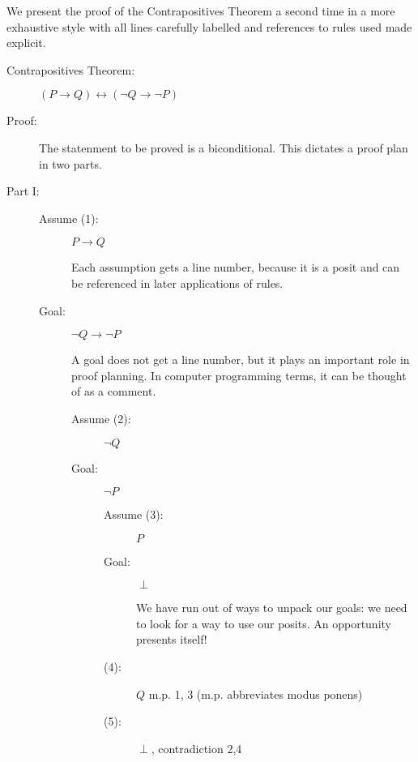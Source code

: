 \documentclass[12pt]{book}
\begin{document}
\newpage

We present the proof of the Contrapositives Theorem a second time in a more exhaustive style with all lines carefully labelled and references to rules
used made explicit.

\begin{description}

\item[Contrapositives Theorem:]  $(P \rightarrow Q) \leftrightarrow (\neg Q
\rightarrow \neg P)$

\item[Proof:]

The statenment to be proved is a biconditional.  This dictates a proof plan in two parts.

\item[Part I:]

\begin{description}

\item[Assume (1):]  $P \rightarrow Q$

Each assumption gets a line number, because it is a posit and can be referenced in later applications of rules.

\item[Goal:]  $\neg Q \rightarrow \neg P$

A goal does not get a line number, but it plays an important role in proof planning.  In computer programming terms, it can be thought of as a comment.

\begin{description}

\item[Assume (2):]  $\neg Q$

\item[Goal:]  $\neg P$

\begin{description}

\item[Assume (3):]  $P$

\item[Goal:]  $\perp$

We have run out of ways to unpack our goals:  we need to look for a way to use our posits.  An opportunity presents itself!

\item[(4):]  $Q$  m.p. 1, 3 (m.p. abbreviates modus ponens)

\item[(5):]  $\perp$, contradiction 2,4


\end{description}
\end{description}
\end{description}
\end{description}
\end{document}
